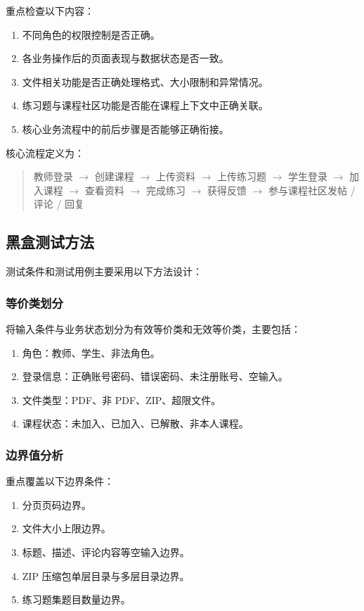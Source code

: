 \documentclass[12pt,a4paper]{ctexart}
\begin{document}
重点检查以下内容：

\begin{enumerate}
  \item 不同角色的权限控制是否正确。
  \item 各业务操作后的页面表现与数据状态是否一致。
  \item 文件相关功能是否正确处理格式、大小限制和异常情况。
  \item 练习题与课程社区功能是否能在课程上下文中正确关联。
  \item 核心业务流程中的前后步骤是否能够正确衔接。
\end{enumerate}

核心流程定义为：

\begin{quote}
教师登录 $\rightarrow$ 创建课程 $\rightarrow$ 上传资料 $\rightarrow$ 上传练习题 $\rightarrow$ 学生登录 $\rightarrow$ 加入课程 $\rightarrow$ 查看资料 $\rightarrow$ 完成练习 $\rightarrow$ 获得反馈 $\rightarrow$ 参与课程社区发帖 / 评论 / 回复
\end{quote}

\subsection{黑盒测试方法}

测试条件和测试用例主要采用以下方法设计：

\subsubsection{等价类划分}

将输入条件与业务状态划分为有效等价类和无效等价类，主要包括：

\begin{enumerate}
  \item 角色：教师、学生、非法角色。
  \item 登录信息：正确账号密码、错误密码、未注册账号、空输入。
  \item 文件类型：PDF、非 PDF、ZIP、超限文件。
  \item 课程状态：未加入、已加入、已解散、非本人课程。
\end{enumerate}

\subsubsection{边界值分析}

重点覆盖以下边界条件：

\begin{enumerate}
  \item 分页页码边界。
  \item 文件大小上限边界。
  \item 标题、描述、评论内容等空输入边界。
  \item ZIP 压缩包单层目录与多层目录边界。
  \item 练习题集题目数量边界。
\end{enumerate}
\end{document}
